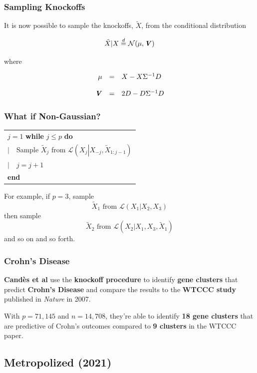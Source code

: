 \documentclass[
	11pt, %
]{beamer}
\begin{document}
\begin{frame}
	\frametitle{Sampling Knockoffs}
	
	It is now possible to sample the knockoffs, $\tilde{X}$, from the conditional distribution
	
	$$\tilde{X}|X\stackrel{d}{=}\mathcal{N}(\mu,\textbf{\textit{V}})$$
	
	\bigskip
	
	where
	
	$$\begin{array}{r c l}
		\mu & = & X-X\Sigma^{-1}D \\
		&& \\
		\textbf{\textit{V}} & = & 2D - D\Sigma^{-1}D
	\end{array}$$
\end{frame}

\begin{frame}
	\frametitle{What if Non-Gaussian?}
	
	\begin{tabular}{l}
		$j=1$ \textbf{while} $j\le p$ \textbf{do} \\
		 $|\text{     }$ Sample $\tilde{X}_j$ from $\mathcal{L}\left(X_j\left|X_{-j},\tilde{X}_{1:j-1}\right.\right)$ \\
		 $|\text{     }$ $j=j+1$ \\
		\textbf{end}
	\end{tabular}
	
	\bigskip
	
	For example, if $p=3$, sample $$\tilde{X}_1 \text{ from } \mathcal{L}(X_1|X_2,X_3)$$ then sample $$\tilde{X}_2 \text{ from } \mathcal{L}(X_2|X_1,X_3,\tilde{X}_1)$$ and so on and so forth.
\end{frame}

\begin{frame}
	\frametitle{Crohn's Disease}
	
	\textbf{Cand\`{e}s et al} use the \textbf{knockoff procedure} to identify \textbf{gene clusters} that predict \textbf{Crohn's Disease} and compare the results to the \textbf{WTCCC study} published in \textit{Nature} in 2007.
	
	\bigskip
	
	With $p=71,145$ and $n=14,708$, they're able to identify \textbf{18 gene clusters} that are predictive of Crohn's outcomes compared to \textbf{9 clusters} in the WTCCC paper.
	
\end{frame}

\subsection{Metropolized (2021)}
\end{document}

